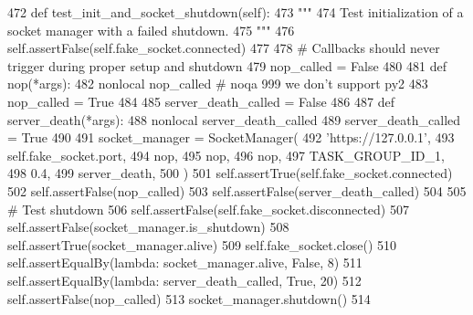\begin{DoxyCode}
472     \textcolor{keyword}{def }test\_init\_and\_socket\_shutdown(self):
473         \textcolor{stringliteral}{"""}
474 \textcolor{stringliteral}{        Test initialization of a socket manager with a failed shutdown.}
475 \textcolor{stringliteral}{        """}
476         self.assertFalse(self.fake\_socket.connected)
477 
478         \textcolor{comment}{# Callbacks should never trigger during proper setup and shutdown}
479         nop\_called = \textcolor{keyword}{False}
480 
481         \textcolor{keyword}{def }nop(*args):
482             nonlocal nop\_called  \textcolor{comment}{# noqa 999 we don't support py2}
483             nop\_called = \textcolor{keyword}{True}
484 
485         server\_death\_called = \textcolor{keyword}{False}
486 
487         \textcolor{keyword}{def }server\_death(*args):
488             nonlocal server\_death\_called
489             server\_death\_called = \textcolor{keyword}{True}
490 
491         socket\_manager = SocketManager(
492             \textcolor{stringliteral}{'https://127.0.0.1'},
493             self.fake\_socket.port,
494             nop,
495             nop,
496             nop,
497             TASK\_GROUP\_ID\_1,
498             0.4,
499             server\_death,
500         )
501         self.assertTrue(self.fake\_socket.connected)
502         self.assertFalse(nop\_called)
503         self.assertFalse(server\_death\_called)
504 
505         \textcolor{comment}{# Test shutdown}
506         self.assertFalse(self.fake\_socket.disconnected)
507         self.assertFalse(socket\_manager.is\_shutdown)
508         self.assertTrue(socket\_manager.alive)
509         self.fake\_socket.close()
510         self.assertEqualBy(\textcolor{keyword}{lambda}: socket\_manager.alive, \textcolor{keyword}{False}, 8)
511         self.assertEqualBy(\textcolor{keyword}{lambda}: server\_death\_called, \textcolor{keyword}{True}, 20)
512         self.assertFalse(nop\_called)
513         socket\_manager.shutdown()
514 
\end{DoxyCode}
\mbox{\label{classparlai_1_1mturk_1_1core_1_1dev_1_1test_1_1test__socket__manager_1_1TestSocketManagerSetupAndFunctions_a9fad20b73bdbba96a862f11a6170db7a}} 
